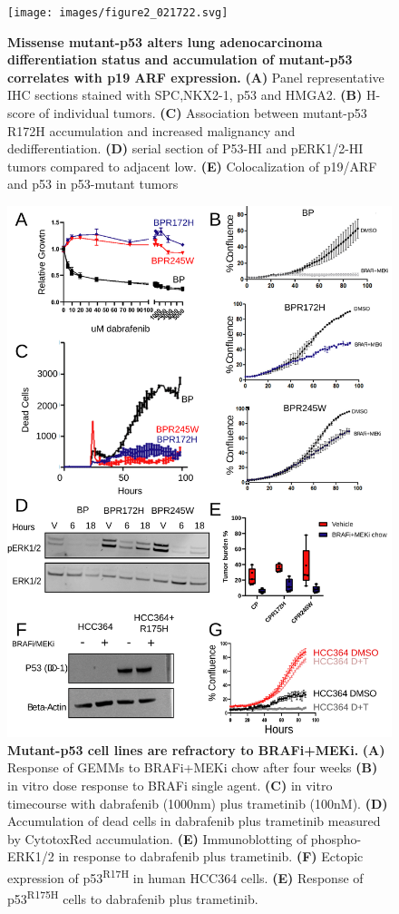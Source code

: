 \begin{figure}
\hypertarget{fig:02}{%
\centering
\texttt{[image: images/figure2\_021722.svg]}
\caption{\textbf{Missense mutant-p53 alters lung adenocarcinoma differentiation status and accumulation of mutant-p53 correlates with p19 ARF expression.} \textbf{(A)} Panel representative IHC sections stained with SPC,NKX2-1, p53 and HMGA2. \textbf{(B)} H-score of individual tumors. \textbf{(C)} Association between mutant-p53 R172H accumulation and increased malignancy and dedifferentiation. \textbf{(D)} serial section of P53-HI and pERK1/2-HI tumors compared to adjacent low. \textbf{(E)} Colocalization of p19/ARF and p53 in p53-mutant tumors}\label{fig:02}
}
\end{figure}

\begin{figure}
\hypertarget{fig:03}{%
\centering
\includegraphics[width=1\textwidth,height=\textheight]{images/figure3_021722.svg}
\caption{\textbf{Mutant-p53 cell lines are refractory to BRAFi+MEKi.} \textbf{(A)} Response of GEMMs to BRAFi+MEKi chow after four weeks \textbf{(B)} in vitro dose response to BRAFi single agent. \textbf{(C)} in vitro timecourse with dabrafenib (1000nm) plus trametinib (100nM). \textbf{(D)} Accumulation of dead cells in dabrafenib plus trametinib measured by CytotoxRed accumulation. \textbf{(E)} Immunoblotting of phospho-ERK1/2 in response to dabrafenib plus trametinib. \textbf{(F)} Ectopic expression of p53\textsuperscript{R17H} in human HCC364 cells. \textbf{(E)} Response of p53\textsuperscript{R175H} cells to dabrafenib plus trametinib.}\label{fig:03}
}
\end{figure}

